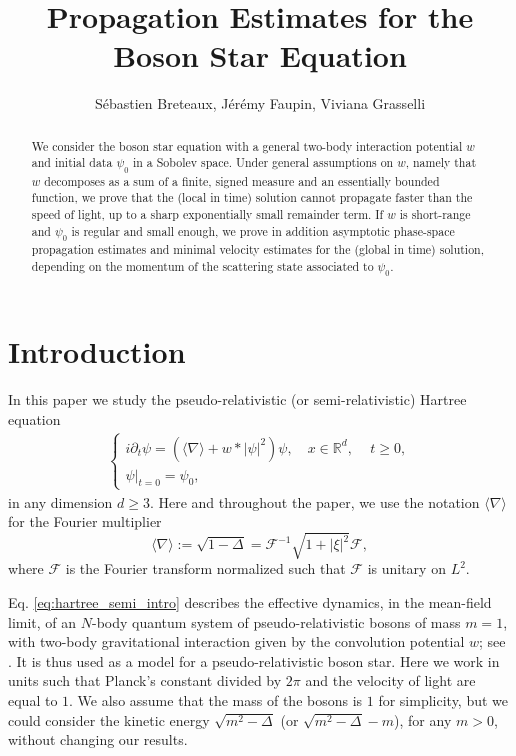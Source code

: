 \documentclass[12pt]{article}
\title{Propagation Estimates for the Boson Star Equation}
\date{}
\author{S\'ebastien Breteaux, J\'er\'emy Faupin, Viviana Grasselli}
\affil{Université de Lorraine, CNRS, IECL, F-57000 Metz, France}
\newcommand{\R}{\mathbb{R}}
\theoremstyle{plain}
\begin{document}
\maketitle
	\begin{abstract}
		We consider the boson star equation with a general two-body interaction potential $w$ and initial data $\psi_0$ in a Sobolev space. Under general assumptions on $w$, namely that $w$ decomposes as a sum of a finite, signed measure and an essentially bounded function, we prove that the (local in time) solution cannot propagate faster than the speed of light, up to a sharp exponentially small remainder term. If $w$ is short-range and $\psi_0$ is regular and small enough, we prove in addition  asymptotic phase-space propagation estimates and minimal velocity estimates for the (global in time) solution, depending on the momentum of the scattering state associated to $\psi_0$.
	\end{abstract}

\tableofcontents
	


	\section{Introduction}

	
In this paper we study the pseudo-relativistic (or semi-relativistic) Hartree equation
\begin{eqnarray}
	\label{eq:hartree_semi_intro}
	\begin{cases}
i\partial_t \psi = (\langle\nabla\rangle + w*|\psi|^2)\psi, \quad  x \in \R^d, \, \quad t\ge0 , \\
\psi|_{t=0} = \psi_0,
	\end{cases}
\end{eqnarray}
in any dimension $d\ge3$. Here and throughout the paper, we use the notation $\langle\nabla\rangle$ for the Fourier multiplier
\begin{equation*}
\langle\nabla\rangle:=\sqrt{1-\Delta}=\mathcal{F}^{-1}\sqrt{1+|\xi|^2}\mathcal{F},
\end{equation*}
where $\mathcal{F}$ is the Fourier transform normalized such that $\mathcal{F}$ is unitary on $L^2$.

Eq. \eqref{eq:hartree_semi_intro} describes the effective dynamics,  in the mean-field limit, of an $N$-body quantum system of pseudo-relativistic bosons of mass $m=1$, with two-body gravitational interaction given by the convolution potential $w$; see \cite{ElgartSchlein}. It is thus used as a model for a pseudo-relativistic boson star. Here we work in units such that Planck's constant divided by $2\pi$ and the velocity of light are equal to $1$. We also assume that the mass of the bosons is $1$ for simplicity, but we could consider the kinetic energy $\sqrt{m^2-\Delta}$ (or $\sqrt{m^2-\Delta}-m$), for any $m>0$, without changing our results.
\end{document}
